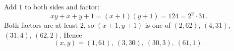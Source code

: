 Add $1$ to both sides and factor:
\[xy+x+y+1=(x+1)(y+1)=124=2^2\cdot31.\]
Both factors are at least $2$, so $(x+1,y+1)$ is one of $(2,62)$, $(4,31)$, $(31,4)$, $(62,2)$. Hence
\[(x,y)=\boxed{(1,61),\ (3,30),\ (30,3),\ (61,1)}.\]
